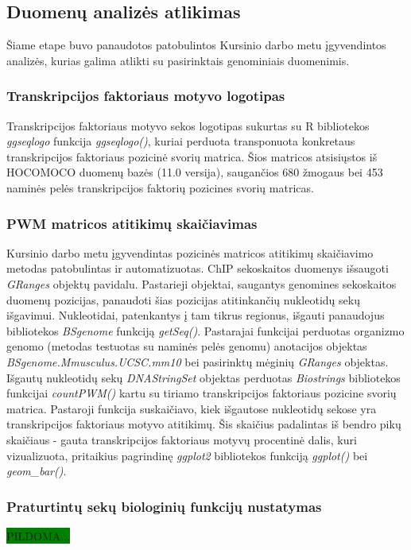 \documentclass[12pt]{article}
\begin{document}
\newpage

\subsection{Duomenų analizės atlikimas}
Šiame etape buvo panaudotos patobulintos Kursinio darbo metu įgyvendintos
analizės, kurias galima atlikti su pasirinktais genominiais duomenimis.

\subsubsection*{Transkripcijos faktoriaus motyvo logotipas}
Transkripcijos faktoriaus motyvo sekos logotipas sukurtas su R bibliotekos
\emph{ggseqlogo}\cite{GGSEQLOGO} funkcija \emph{ggseqlogo()}, kuriai perduota
transponuota konkretaus transkripcijos faktoriaus pozicinė svorių matrica.
Šios matricos atsisiųstos iš HOCOMOCO\cite{HOCOMOCO} duomenų bazės (11.0
versija), saugančios 680 žmogaus bei 453 naminės pelės transkripcijos faktorių
pozicines svorių matricas.

\subsubsection*{PWM matricos atitikimų skaičiavimas}
Kursinio darbo metu įgyvendintas pozicinės matricos atitikimų skaičiavimo
metodas patobulintas ir automatizuotas. ChIP sekoskaitos duomenys išsaugoti
\emph{GRanges} objektų pavidalu. Pastarieji objektai, saugantys genomines
sekoskaitos duomenų pozicijas, panaudoti šias pozicijas atitinkančių nukleotidų
sekų išgavimui. Nukleotidai, patenkantys į tam tikrus regionus, išgauti
panaudojus bibliotekos \emph{BSgenome}\cite{BSGENOME} funkciją \emph{getSeq()}.
Pastarajai funkcijai perduotas organizmo genomo (metodas testuotas su naminės
pelės genomu) anotacijos objektas
\emph{BSgenome.Mmusculus.UCSC.mm10}\cite{BSMUSMUSCULUS} bei pasirinktų mėginių
\emph{GRanges} objektas. Išgautų nukleotidų sekų \emph{DNAStringSet} objektas
perduotas \emph{Biostrings}\cite{BIOSTRINGS} bibliotekos funkcijai
\emph{countPWM()} kartu su tiriamo transkripcijos faktoriaus pozicine svorių
matrica. Pastaroji funkcija suskaičiavo, kiek išgautose nukleotidų sekose yra
transkripcijos faktoriaus motyvo atitikimų. Šis skaičius padalintas iš bendro
pikų skaičiaus - gauta transkripcijos faktoriaus motyvų procentinė dalis,
kuri vizualizuota, pritaikius pagrindinę \emph{ggplot2} bibliotekos funkciją
\emph{ggplot()} bei \emph{geom\_bar()}.

\subsubsection*{Praturtintų sekų biologinių funkcijų nustatymas}
\colorbox{green}{PILDOMA...}
\end{document}

